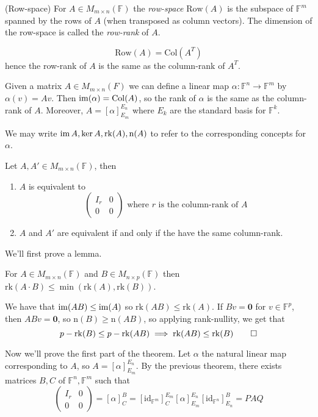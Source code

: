 \documentclass{article}
\newcommand{\F}{\mathbb{F}}
\newcommand{\n}{\mathrm{n}}
\newcommand{\rk}{\mathrm{rk}}
\newcommand{\Col}{\mathrm{Col}}
\newcommand{\Row}{\mathrm{Row}}
\begin{document}
\begin{definition}
	(Row-space) For $ A\in M_{m\times n}(\F) $ the \textit{row-space} $ \Row(A) $ is the subspace of $ \F^m $ spanned by the rows of $ A $ (when transposed as column vectors). The dimension of the row-space is called the \textit{row-rank} of $ A $.
\end{definition}
\begin{remark}
  \[
    \Row(A)=\Col(A^T)
  \]
  hence the row-rank of $ A $ is the same as the column-rank of $ A^T $.
\end{remark}
\begin{remark}
	Given a matrix $ A\in M_{m\times n}(F) $ we can define a linear map $ \alpha:\F^n\to \F^m $ by $ \alpha(v)=Av $. Then $ \ima(\alpha)=\Col(A) $, so the rank of $ \alpha $ is the same as the column-rank of $ A $. Moreover, $ A=[\alpha]^{E_n}_{E_m} $ where $ E_k $ are the standard basis for $ \F^k $.
\end{remark}
We may write $ \ima A,\ker A, \rk(A),\n(A) $ to refer to the corresponding concepts for $ \alpha $.
\begin{theorem}
	Let $ A, A' \in M_{m\times n}(\F) $, then
	\begin{enumerate}
		\item $ A $ is equivalent to
\[
  \begin{pmatrix}
	  I_r & 0 \\
	  0 & 0
  \end{pmatrix}
  \text{ where } r \text{ is the column-rank of } A
\]
\item $ A $ and $ A' $ are equivalent if and only if the have the same column-rank.

	\end{enumerate}
\end{theorem}
\pf We'll first prove a lemma.
\begin{lemma}
	For $ A\in M_{m\times n}(\F) $ and $ B\in M_{n\times p}(\F) $ then $ \rk(A\cdot B)\le \min(\rk(A),\rk(B)) $.
\end{lemma}
\pf We have that $ \operatorname{im}(AB)\le \operatorname{im}(A) $ so $ \rk(AB)\le \rk(A) $. If $ Bv=\mathbf 0 $ for $ v\in \F^p $, then $ ABv=\mathbf 0 $, so $ \n(B)\ge \n(AB) $, so applying rank-nullity, we get that
\[
  p-\rk(B)\le p-\rk(AB)\implies \rk(AB)\le \rk(B)\qed
\]
\par
Now we'll prove the first part of the theorem. Let $ \alpha $ the natural linear map corresponding to $ A $, so $ A=[\alpha]^{E_n}_{E_m} $. By the previous theorem, there exists matrices $ B,C $ of $ \F^n,\F^m $ such that
\[
  \begin{pmatrix}
	  I_r & 0\\ 0 & 0
  \end{pmatrix} = [\alpha]^B_C=[\mathrm{id}_{\F^m}]^{E_m}_C[\alpha]^{E_n}_{E_m}[\mathrm{id}_{\F^n}]^B_{E_n}=PAQ
\]
\end{document}
